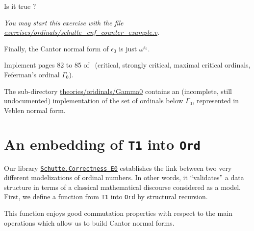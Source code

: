 {\begin{exercise}
Is it true ?

\emph{You may start this exercise with the file
    \href{https://github.com/coq-community/hydra-battles/tree/master/exercises/ordinals/schutte_cnf_counter_example.v}{exercises/ordinals/schutte\_cnf\_counter\_example.v}.}
\end{exercise}

Finally, the Cantor normal form of $\epsilon_0$ is just $\omega^{\epsilon_0}$.




\begin{project}
Implement pages 82 to 85 of~\cite{schutte} (critical, strongly critical, maximal critical ordinals, Feferman's ordinal $\Gamma_0$).
\end{project}

\begin{remark}
The sub-directory
    \href{https://github.com/coq-community/hydra-battles/tree/master/theories/ordinals/Gamma0}{theories/oridinals/Gamma0} contains an (incomplete, still undocumented) implementation of the set of ordinals below $\Gamma_0$, represented in Veblen normal form. 
\end{remark}

\section{An embedding of \texttt{T1} into \texttt{Ord}}


Our library 
\href{../theories/html/hydras.Schutte.Correctness_E0.html}%
{\texttt{Schutte.Correctness\_E0}} establishes the link between two very different modelizations of ordinal numbers. In other words, it ``validates'' a data structure in terms of
a classical mathematical discourse considered as a model. 
First, we define a function from \texttt{T1} into  \texttt{Ord} by structural recursion.




This function enjoys good commutation properties with respect to the main operations which
allow us to build Cantor normal forms.






}
